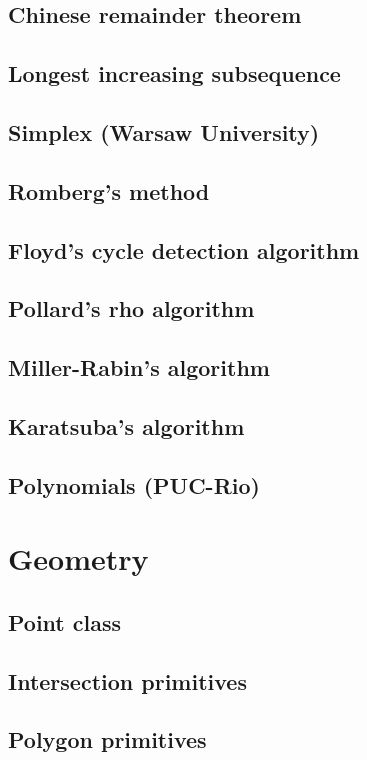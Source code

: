 \documentclass[a4paper]{amsart}
\begin{document}
    \subsection{Chinese remainder theorem}
    \subsection{Longest increasing subsequence}
    \subsection{Simplex (Warsaw University)}
    \subsection{Romberg's method}
    \subsection{Floyd's cycle detection algorithm}
    \subsection{Pollard's rho algorithm}
    \subsection{Miller-Rabin's algorithm}
    \subsection{Karatsuba's algorithm}
    \subsection{Polynomials (PUC-Rio)}

  \section{Geometry}
    \subsection{Point class}
    \subsection{Intersection primitives}
    \subsection{Polygon primitives}
\end{document}
